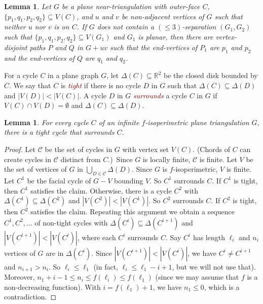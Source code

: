 \documentclass[a4paper,11pt]{article}
\newcommand{\defn}[1]{\textcolor{Maroon}{\emph{#1}}\index{#1}}
\theoremstyle{plain}
\newtheorem{lem}[thm]{Lemma}
\theoremstyle{definition}
\renewcommand{\leq}{\leqslant}
\newcommand{\CC}{\mathcal{C}}
\begin{document}
\begin{lem} \label{lem:special2linkage}
Let $G$ be a plane near-triangulation with outer-face $C$, $\{p_1,q_1,p_2,q_2\} \subseteq V(C)$, and $u$ and $v$ be non-adjacent vertices of $G$ such that neither $u$ nor $v$ is on $C$.  If $G$ does not contain a $(\leq 3)$-separation $(G_1, G_2)$ such that $\{p_1, q_1, p_2, q_2\} \subseteq V(G_1)$ and $G_1$ is planar, then there are vertex-disjoint paths $P$ and $Q$ in $G + uv$ such that the end-vertices of $P_1$ are $p_1$ and $p_2$ and the end-vertices of $Q$ are $q_1$ and $q_2$. 
\end{lem}

For a cycle $C$ in a plane graph $G$, let $\Delta(C) \subseteq \mathbb{R}^2$ be the closed disk bounded by $C$.  We say that $C$ is \defn{tight} if there is no cycle $D$ in $G$ such that $\Delta(C) \subseteq \Delta(D)$ and $|V(D)| < |V(C)|$. A cycle $D$ in $G$ \defn{surrounds} a cycle $C$ in $G$ if $V(C) \cap V(D)=\emptyset$ and $\Delta(C) \subseteq \Delta(D)$.

\begin{lem} \label{FindDisjointTightCycle}
For every cycle $C$ of an infinite $f$-isoperimetric plane triangulation $G$, there is a tight cycle that surrounds $C$.
\end{lem}

\begin{proof}
Let $\CC$ be the set of cycles in $G$ with vertex set $V(C)$. (Chords of  $C$ can create cycles in $\CC$ distinct from $C$.)\ Since $G$ is locally finite, $\CC$ is finite. Let $V$ be the set of vertices of $G$ in $\bigcup_{D\in\CC} \Delta(D)$. Since $G$ is $f$-isoperimetric, $V$ is finite. Let $C^1$ be the facial cycle of $G-V$ bounding $V$. So $C^1$ surrounds $C$. If $C^1$ is tight, then $C^1$ satisfies the claim. Otherwise, there is a cycle $C^2$ with $\Delta(C^1)\subseteq \Delta(C^2)$ and $|V(C^2)|<|V(C^1)|$. So $C^2$ surrounds $C$. If $C^2$ is tight, then $C^2$ satisfies the claim. Repeating this argument we obtain a sequence $C^1,C^2,\dots$ of non-tight cycles with $\Delta(C^i) \subseteq \Delta(C^{i+1})$ and $|V(C^{i+1})|<|V(C^i)|$, where each $C^i$ surrounds $C$.  Say $C^i$ has length $\ell_i$ and $n_i$ vertices of $G$ are in $\Delta(C^i)$. Since $|V(C^{i+1})|<|V(C^i)|$, we have $C^i\neq C^{i+1}$ and $n_{i+1}> n_i$. So $\ell_i \leq \ell_1$ (in fact, $\ell_i \leq \ell_1 - i +1$, but we will not use that). Moreover, $n_1 + i -1 \leq n_i \leq f(\ell_i) \leq f( \ell_1)$ (since we may assume that $f$ is a non-decreasing function). With $i=f(\ell_1)+1$, we have $n_1\leq 0$, which is a contradiction.
\end{proof}
\end{document}
